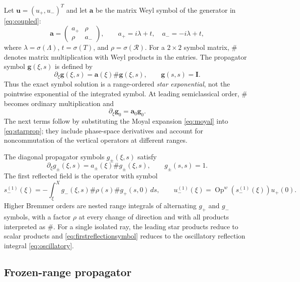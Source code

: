 \documentclass[11pt]{article}
\newcommand{\pd}{\partial}
\newcommand{\Op}{\operatorname{Op}^{w}}
\newcommand{\Rop}{\mathcal R}
\begin{document}
Let $\mathbf u=(u_+,u_-)^T$ and let $\mathbf a$ be the matrix Weyl symbol of
the generator in \eqref{eq:coupled}:
\begin{equation}\label{eq:amatrix}
  \mathbf a=\begin{pmatrix}a_+&\rho\\\rho&a_-\end{pmatrix},
  \qquad a_+=i\lambda+t,\quad a_-=-i\lambda+t,
\end{equation}
where $\lambda=\sigma(\Lambda)$, $t=\sigma(T)$, and $\rho=\sigma(\Rop)$.
For a $2\times2$ symbol matrix, $\# $ denotes matrix multiplication with
Weyl products in the entries. The propagator symbol $\mathbf g(\xi,s)$ is
defined by
\begin{equation}\label{eq:starprop}
  \pd_\xi\mathbf g(\xi,s)=\mathbf a(\xi)\#\mathbf g(\xi,s),
  \qquad \mathbf g(s,s)=\mathbf I.
\end{equation}
Thus the exact symbol solution is a range-ordered \emph{star exponential},
not the pointwise exponential of the integrated symbol. At leading
semiclassical order, $\#$ becomes ordinary multiplication and
\begin{equation}\label{eq:leadingprop}
  \pd_\xi\mathbf g_0=\mathbf a_0\mathbf g_0.
\end{equation}
The next terms follow by substituting the Moyal expansion \eqref{eq:moyal}
into \eqref{eq:starprop}; they include phase-space derivatives and account
for noncommutation of the vertical operators at different ranges.

The diagonal propagator symbols $g_\pm(\xi,s)$ satisfy
\begin{equation}\label{eq:diagonalstar}
  \pd_\xi g_\pm(\xi,s)=a_\pm(\xi)\# g_\pm(\xi,s),
  \qquad g_\pm(s,s)=1.
\end{equation}
The first reflected field is the operator with symbol
\begin{equation}\label{eq:firstreflectionsymbol}
  s_-^{(1)}(\xi)=-\int_\xi^X
  g_-(\xi,s)\#\rho(s)\#g_+(s,0)\,ds,
  \qquad u_-^{(1)}(\xi)=\Op(s_-^{(1)}(\xi))u_+(0).
\end{equation}
Higher Bremmer orders are nested range integrals of alternating $g_+$ and
$g_-$ symbols, with a factor $\rho$ at every change of direction and with
all products interpreted as $\#$. For a single isolated ray, the leading
star products reduce to scalar products and \eqref{eq:firstreflectionsymbol}
reduces to the oscillatory reflection integral \eqref{eq:oscillatory}.

\subsection{Frozen-range propagator}
\end{document}
